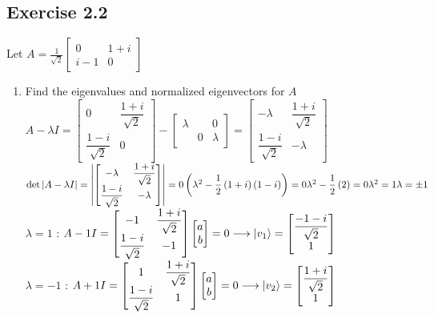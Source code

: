 \documentclass[12pt]{article}
\theoremstyle{plain}
\theoremstyle{nonumberplain}
\theoremstyle{plain}
\theoremstyle{nonumberplain}
\newcommand\1{{\bf 1}}
\newcommand{\bmat}[1]{\begin{bmatrix*} #1 \end{bmatrix*}} %
\newcommand{\<}{\left\langle}
\renewcommand{\>}{\right\rangle}
\begin{document}
\subsection{Exercise 2.2}
Let $A=\frac{1}{\sqrt{2}}\bmat{0 & 1+i \\ i-1 & 0}$
\begin{enumerate}[label=(\alph*)]
\item Find the eigenvalues and normalized eigenvectors for $A$ \\
$A-\lambda I=\begin{bmatrix}
0 & \dfrac{1+i}{\sqrt{2}} \\
\dfrac{1-i}{\sqrt{2}} & 0
\end{bmatrix}-\begin{bmatrix}
\lambda  &  & 0 \\
 & 0 & \lambda 
\end{bmatrix}=\begin{bmatrix}
-\lambda  & \dfrac{1+i}{\sqrt{2}} \\
\dfrac{1-i}{\sqrt{2}} & -\lambda 
\end{bmatrix}$\\$\det \left| A-\lambda I\right| =\left| \begin{bmatrix}
-\lambda  & \dfrac{1+i}{\sqrt{2}} \\
\dfrac{1-i}{\sqrt{2}} & -\lambda 
\end{bmatrix}\right| =0\\
\left( \lambda ^{2}-\dfrac{1}{2}\left( 1+i\right) \left( 1-i\right) \right) =0\\
\lambda ^{2}-\dfrac{1}{2}\left( 2\right) =0\\
\lambda ^{2}=1\\
\lambda =\pm 1$ \\
$\lambda=1$ : $A-1I=\bmat{-1 & \dfrac{1+i}{\sqrt{2}} \\ \dfrac{1-i}{\sqrt{2}} & -1}\bmat{a \\ b}=0\longrightarrow\ket{v_1}=\bmat{\dfrac{-1-i}{\sqrt{2}} \\ 1}$ \\
$\lambda=-1$ : $A+1I=\bmat{1 & \dfrac{1+i}{\sqrt{2}} \\ \dfrac{1-i}{\sqrt{2}} & 1}\bmat{a \\ b}=0\longrightarrow\ket{v_2}=\bmat{\dfrac{1+i}{\sqrt{2}} \\ 1}$


\end{enumerate}
\end{document}
